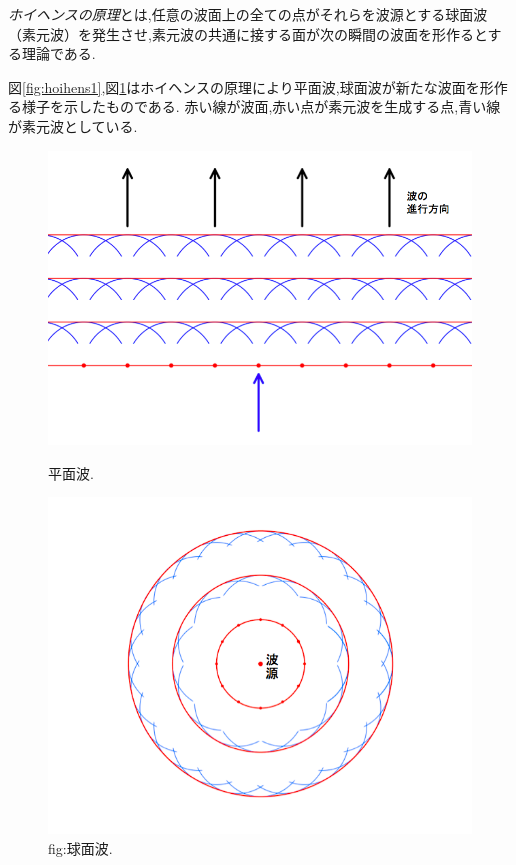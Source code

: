 \emph{ホイヘンスの原理}とは,任意の波面上の全ての点がそれらを波源とする球面波（素元波）を発生させ,素元波の共通に接する面が次の瞬間の波面を形作るとする理論である.

図\ref{fig:hoihens1},図\ref{fig:hoihens2}はホイヘンスの原理により平面波,球面波が新たな波面を形作る様子を示したものである. 赤い線が波面,赤い点が素元波を生成する点,青い線が素元波としている.

\begin{figure}[thbp]
\begin{minipage}{0.5\hsize}
\begin{center}
\includegraphics[width=\linewidth]
  {../background/hoihens1.png}
\caption{平面波.}
\label{fig:hoihens1}
\end{center}
\end{minipage}%
\begin{minipage}{0.5\hsize}
\begin{center}
\includegraphics[width=\linewidth]
  {../background/hoihens2.png}
\caption{fig:球面波.}
\label{fig:hoihens2}
\end{center}
\end{minipage}
\end{figure}
\newpage



